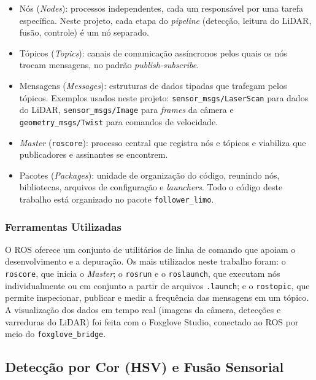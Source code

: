 \begin{itemize}
  \item Nós (\textit{Nodes}): processos independentes, cada um
  responsável por uma tarefa específica. Neste projeto, cada etapa do
  \textit{pipeline} (detecção, leitura do LiDAR, fusão, controle) é um nó separado.

  \item Tópicos (\textit{Topics}): canais de comunicação assíncronos
  pelos quais os nós trocam mensagens, no padrão \textit{publish-subscribe}.

  \item Mensagens (\textit{Messages}): estruturas de dados tipadas que
  trafegam pelos tópicos. Exemplos usados neste projeto:
  \texttt{sensor\_msgs/LaserScan} para dados do LiDAR, \texttt{sensor\_msgs/Image}
  para \textit{frames} da câmera e \texttt{geometry\_msgs/Twist} para comandos de
  velocidade.

  \item \textit{Master} (\texttt{roscore}): processo central que registra
  nós e tópicos e viabiliza que publicadores e assinantes se encontrem.

  \item Pacotes (\textit{Packages}): unidade de organização do código,
  reunindo nós, bibliotecas, arquivos de configuração e \textit{launchers}. Todo o
  código deste trabalho está organizado no pacote \texttt{follower\_limo}.
\end{itemize}

\subsubsection{Ferramentas Utilizadas}

O ROS oferece um conjunto de utilitários de linha de comando que apoiam o
desenvolvimento e a depuração. Os mais utilizados neste trabalho foram: o
\texttt{roscore}, que inicia o \textit{Master}; o \texttt{rosrun} e o
\texttt{roslaunch}, que executam nós individualmente ou em conjunto a partir de
arquivos \texttt{.launch}; e o \texttt{rostopic}, que permite inspecionar,
publicar e medir a frequência das mensagens em um tópico. A visualização dos dados
em tempo real (imagens da câmera, detecções e varreduras do LiDAR) foi feita com
o Foxglove Studio, conectado ao ROS por meio do \texttt{foxglove\_bridge}.

\subsection{Detecção por Cor (HSV) e Fusão Sensorial}
\label{sec:hsv_fusao}

